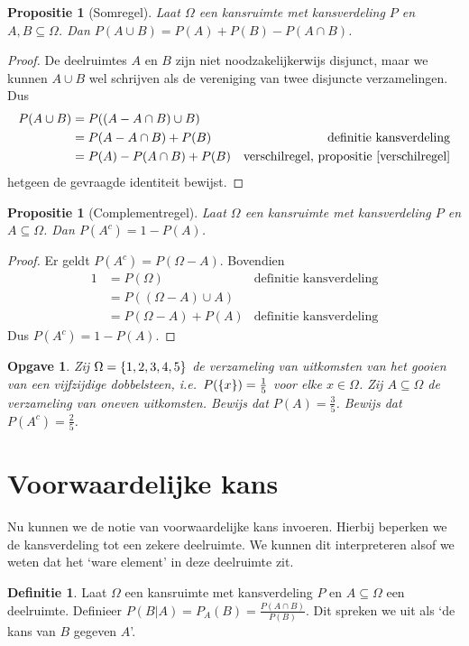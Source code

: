 \documentclass[a4paper]{book}
\newtheorem{proposition}[theorem]{Propositie}
\newtheorem{exercise}[theorem]{Opgave}
\theoremstyle{definition}
\newtheorem{definition}[theorem]{Definitie}
\begin{document}
\begin{proposition}[Somregel]\label{somregel}
    Laat $\Omega$ een kansruimte met kansverdeling $P$ en $A,B \subseteq \Omega$.
    Dan $P(A \cup B) = P(A) + P(B) - P(A \cap B)$.
\end{proposition}
\begin{proof}
    De deelruimtes $A$ en $B$ zijn niet noodzakelijkerwijs disjunct, maar we kunnen $A \cup B$ wel schrijven als de vereniging van twee disjuncte verzamelingen.
    Dus
    \begin{align*}
        P(A \cup B)     &= P( (A - A \cap B) \cup B) \\
                        &= P(A - A \cap B) + P(B)  & \text{definitie kansverdeling}\\
                        &= P(A) - P(A \cap B) + P(B) & \text{verschilregel, propositie~\ref{verschilregel}}
    \end{align*}
    hetgeen de gevraagde identiteit bewijst.
\end{proof}

\begin{proposition}[Complementregel]\label{complementregel}
    Laat $\Omega$ een kansruimte met kansverdeling $P$ en $A \subseteq \Omega$.
    Dan $P(A^c) = 1 - P(A)$.
\end{proposition}
\begin{proof}
    Er geldt $P(A^c) = P(\Omega - A)$.
    Bovendien
    \begin{align*}
        1 &= P(\Omega) & \text{definitie kansverdeling}\\
          &= P( (\Omega - A) \cup A) \\
          &= P(\Omega - A) + P(A) & \text{definitie kansverdeling}
    \end{align*}
    Dus $P(A^c) = 1 - P(A)$.
\end{proof}


\begin{exercise}
    Zij $\Omega = \set{1,2,3,4,5}$ de verzameling van uitkomsten van het gooien van een vijfzijdige dobbelsteen,
    i.e.\ $P(\set{x}) = \frac{1}{5}$ voor elke $x \in \Omega$.
    Zij $A \subseteq \Omega$ de verzameling van oneven uitkomsten.
    Bewijs dat $P(A) = \frac{3}{5}$.
    Bewijs dat $P(A^c) = \frac{2}{5}$.
\end{exercise}


\section{Voorwaardelijke kans}
Nu kunnen we de notie van voorwaardelijke kans invoeren.
Hierbij beperken we de kansverdeling tot een zekere deelruimte.
We kunnen dit interpreteren alsof we weten dat het `ware element' in deze deelruimte zit.
\begin{definition}
    Laat $\Omega$ een kansruimte met kansverdeling $P$ en $A \subseteq \Omega$ een deelruimte.
    Definieer $P(B|A) = P_A(B) = \frac{P(A \cap B)}{P(B)}$. Dit spreken we uit als `de kans van $B$ gegeven $A$'.
\end{definition}
\end{document}
